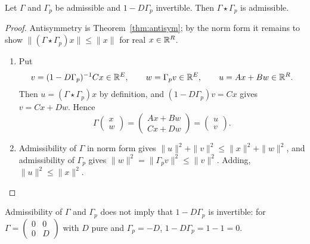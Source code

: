 \begin{theorem}\label{thm:contract}
Let $\Gamma$ and $\Gamma_p$ be admissible and $1-D\Gamma_p$ invertible. Then
$\Gamma\star\Gamma_p$ is admissible.
\end{theorem}
\begin{proof}
Antisymmetry is Theorem~\ref{thm:antisym}; by the norm form it remains to show
$\|(\Gamma\star\Gamma_p)x\|\leq\|x\|$ for real $x\in\mathbb R^R$.
\begin{enumerate}
\item[(a)] Put
\[
 v=(1-D\Gamma_p)^{-1}Cx\in\mathbb R^E,\qquad w=\Gamma_pv\in\mathbb R^E,\qquad u=Ax+Bw\in\mathbb R^R .
\]
Then $u=(\Gamma\star\Gamma_p)x$ by definition, and $(1-D\Gamma_p)v=Cx$ gives
$v=Cx+Dw$. Hence
\[
 \Gamma\begin{pmatrix}x\\w\end{pmatrix}
 =\begin{pmatrix}Ax+Bw\\Cx+Dw\end{pmatrix}=\begin{pmatrix}u\\v\end{pmatrix}.
\]
\item[(b)] Admissibility of $\Gamma$ in norm form gives
$\|u\|^2+\|v\|^2\leq\|x\|^2+\|w\|^2$, and admissibility of $\Gamma_p$ gives
$\|w\|^2=\|\Gamma_pv\|^2\leq\|v\|^2$. Adding, $\|u\|^2\leq\|x\|^2$.
\end{enumerate}
\end{proof}
\begin{remark}\label{rem:invertibility}
Admissibility of $\Gamma$ and $\Gamma_p$ does not imply that $1-D\Gamma_p$ is
invertible: for $\Gamma=\begin{pmatrix}0&0\\0&D\end{pmatrix}$ with $D$ pure and
$\Gamma_p=-D$, $1-D\Gamma_p=1-1=0$. 
\end{remark}

